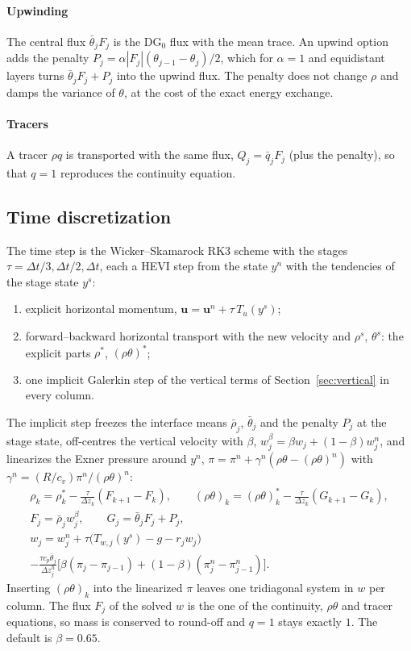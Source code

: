 \documentclass[preprint,12pt]{elsarticle}
\newcommand{\bu}{\mathbf{u}}
\theoremstyle{definition}
\begin{document}
\paragraph{Upwinding} The central flux $\bar\theta_jF_j$ is the DG$_0$ flux with the mean trace. An upwind
option adds the penalty $P_j = \alpha|F_j|(\theta_{j-1} - \theta_j)/2$, which for $\alpha = 1$ and
equidistant layers turns $\bar\theta_jF_j + P_j$ into the upwind flux. The penalty does not change $\rho$
and damps the variance of $\theta$, at the cost of the exact energy exchange.

\paragraph{Tracers} A tracer $\rho q$ is transported with the same flux, $Q_j = \bar q_jF_j$ (plus the
penalty), so that $q = 1$ reproduces the continuity equation.

\subsection{Time discretization}\label{sec:time}
The time step is the Wicker--Skamarock RK3 scheme \cite{WickerSkamarock2002} with the stages
$\tau = \Delta t/3, \Delta t/2, \Delta t$, each a HEVI step from the state $y^n$ with the tendencies of the
stage state $y^s$:
\begin{enumerate}
\item explicit horizontal momentum, $\bu = \bu^n + \tau\,T_u(y^s)$;
\item forward--backward horizontal transport with the new velocity and $\rho^s$, $\theta^s$: the explicit
  parts $\rho^\ast$, $(\rho\theta)^\ast$;
\item one implicit Galerkin step of the vertical terms of Section~\ref{sec:vertical} in every column.
\end{enumerate}
The implicit step freezes the interface means $\bar\rho_j$, $\bar\theta_j$ and the penalty $P_j$ at the stage
state, off-centres the vertical velocity with $\beta$, $w^\beta_j = \beta w_j + (1-\beta)w^n_j$, and
linearizes the Exner pressure around $y^n$, $\pi = \pi^n + \gamma^n(\rho\theta - (\rho\theta)^n)$ with
$\gamma^n = (R/c_v)\pi^n/(\rho\theta)^n$:
\begin{gather*}
  \rho_k = \rho^\ast_k - \frac{\tau}{\Delta z_k}(F_{k+1} - F_k),\qquad
  (\rho\theta)_k = (\rho\theta)^\ast_k - \frac{\tau}{\Delta z_k}(G_{k+1} - G_k),\\
  F_j = \bar\rho_jw^\beta_j,\qquad G_j = \bar\theta_jF_j + P_j,\\
  w_j = w^n_j + \tau\bigl(T_{w,j}(y^s) - g - r_jw_j\bigr)\\
  - \frac{\tau c_p\bar\theta_j}{\Delta z^h_j}\bigl[\beta(\pi_j - \pi_{j-1}) + (1-\beta)(\pi^n_j - \pi^n_{j-1})\bigr].
\end{gather*}
Inserting $(\rho\theta)_k$ into the linearized $\pi$ leaves one tridiagonal system in $w$ per column. The
flux $F_j$ of the solved $w$ is the one of the continuity, $\rho\theta$ and tracer equations, so mass is
conserved to round-off and $q = 1$ stays exactly $1$. The default is $\beta = 0.65$.
\end{document}
